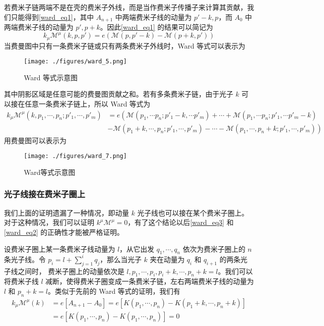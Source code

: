 若费米子链两端不是在壳的费米子外线，而是当作费米子传播子来计算其贡献，我们只能得到\autoref{ward_eq1}，其中 $A_{n+1}$ 中两端费米子线的动量为 $p'-k,p$，而 $A_{0}$ 中两端费米子线的动量为 $p',p+k$。因此\autoref{ward_eq1} 的结果可以简记为
\begin{equation}\label{ward_eq3}
k_\mu\mathcal{M}^\mu(k,p,p') = e(\mathcal{M}(p,p'-k)-\mathcal{M}(p+k,p'))
\end{equation}
当费曼图中只有一条费米子链或只有两条费米子外线时，Ward 等式可以表示为
\begin{figure}[ht]
\centering
\texttt{[image: ./figures/ward\_5.png]}
\caption{Ward 等式示意图} \label{ward_fig5}
\end{figure}
其中阴影区域是任意可能的费曼图贡献之和。若有多条费米子链，由于光子 $k$ 可以接在任意一条费米子链上，所以 Ward 等式为
\begin{equation}\label{ward_eq2}
\begin{aligned}
k_\mu\mathcal{M}^\mu(k,p_1,\cdots,p_n;p'_1,\cdots,p'_m)
&= e\left(
\mathcal{M}(p_1,\cdots p_n;p'_1-k,\cdots p'_m)+\cdots+\mathcal{M}(p_1,\cdots p_n;p'_1,\cdots p'_m-k)
\right.
\\
&\left.-\mathcal{M}(p_1+k,\cdots,p_n;p'_1,\cdots,p'_m)-\cdots-\mathcal{M}(p_1,\cdots,p_n+k;p'_1,\cdots,p'_m)
\right)
\end{aligned}
\end{equation}
用费曼图可以表示为
\begin{figure}[ht]
\centering
\texttt{[image: ./figures/ward\_7.png]}
\caption{Ward等式示意图} \label{ward_fig7}
\end{figure}
\subsubsection{光子线接在费米子圈上}
我们上面的证明遗漏了一种情况，即动量 $k$ 光子线也可以接在某个费米子圈上。对于这种情况，我们可以证明 $k^\mu \mathcal{M}^\mu=0$，有了这个结论以后\autoref{ward_eq3} 和\autoref{ward_eq2} 的正确性才能被严格证明。

设费米子圈上某一条费米子线动量为 $l$，从它出发 $q_1,\cdots,q_n$ 依次为费米子圈上的 $n$ 条光子线。令 $p_i=l+\sum_{j=1}^i q_j$，那么当光子 $k$ 夹在动量为 $q_i$ 和 $q_{i+1}$ 的两条光子线之间时，
费米子圈上的动量依次是 $l,p_1,\cdots,p_i,
p_i+k,\cdots,p_n+k=l$。我们可以将费米子线 $l$ 减断，使得费米子圈变成一条费米子链，左右两端费米子线的动量为 $l$ 和 $p_n+k=l$。类似于先前的 Ward 等式的证明，我们有
\begin{equation}
\begin{aligned}
k_\mu \mathcal{M}^\mu(k)&=e[A_{n+1}-A_0] =e[K(p_1,\cdots,p_n)-K(p_1+k,\cdots,p_n+k)]\\
&=e[K(p_1,\cdots,p_n)-K(p_1,\cdots,p_n)]=0
\end{aligned}
\end{equation}


